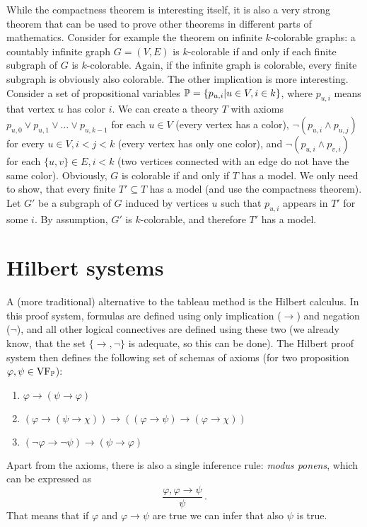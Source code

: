 While the compactness theorem is interesting itself, it is also a very strong theorem that can be used to prove other theorems in different parts of mathematics. Consider for example the theorem on infinite $k$-colorable graphs: a countably infinite graph $G = (V, E)$ is $k$-colorable if and only if each finite subgraph of $G$ is $k$-colorable. Again, if the infinite graph is colorable, every finite subgraph is obviously also colorable. The other implication is more interesting. Consider a set of propositional variables $\mathbb{P} = \{p_{u,i} | u \in V, i \in k\}$, where $p_{u,i}$ means that vertex $u$ has color $i$. We can create a theory $T$ with axioms $p_{u,0} \lor p_{u,1} \lor \dots \lor p_{u,k-1}$ for each $u \in V$ (every vertex has a color), $\neg(p_{u,i} \land p_{u,j})$ for every $u \in V, i < j < k$ (every vertex has only one color), and $\neg(p_{u,i} \land p_{v,i})$ for each $\{u,v\}\in E, i < k$ (two vertices connected with an edge do not have the same color). Obviously, $G$ is colorable if and only if $T$ has a model. We only need to show, that every finite $T' \subseteq T$ has a model (and use the compactness theorem). Let $G'$ be a subgraph of $G$ induced by  vertices $u$ such that $p_{u,i}$ appears in $T'$ for some $i$. By assumption, $G'$ is $k$-colorable, and therefore $T'$ has a model.

\section{Hilbert systems}

A (more traditional) alternative to the tableau method is the Hilbert calculus. In this proof system, formulas are defined using only implication ($\to$) and negation ($\neg$), and all other logical connectives are defined using these two (we already know, that the set $\{\to, \neg\}$ is adequate, so this can be done). The Hilbert proof system then defines the following set of schemas of axioms (for two proposition $\varphi, \psi \in \operatorname{VF}_\mathbb{P}$):
\begin{enumerate}
\item $\varphi \to (\psi \to \varphi)$
\item $(\varphi \to (\psi \to \chi)) \to ((\varphi \to \psi) \to (\varphi \to \chi))$
\item $(\neg \varphi \to \neg \psi) \to (\psi \to \varphi)$
\end{enumerate}
Apart from the axioms, there is also a single inference rule: \emph{modus ponens}, which can be expressed as $$\frac{\varphi, \varphi \to \psi}{\psi}\,.$$That means that if $\varphi$ and $\varphi \to \psi$ are true we can infer that also $\psi$ is true.

